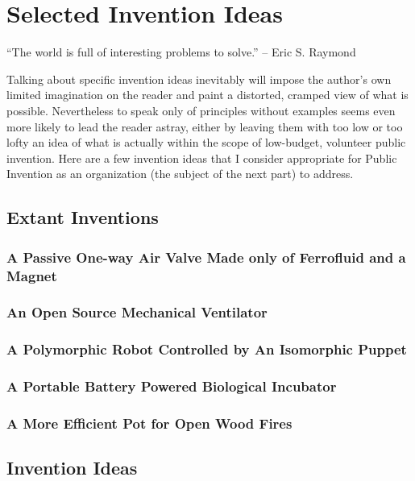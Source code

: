 \documentclass[
	fontsize=10pt, %
	twoside=false, %
	secnumdepth=1, %
]{kaobook}
\begin{document}
\chapter{Selected Invention Ideas}

``The world is full of interesting problems to solve.'' -- Eric S. Raymond

Talking about specific invention ideas inevitably will impose the author's own limited
imagination on the reader and paint a distorted, cramped view of what is possible.
Nevertheless to speak only of principles without examples seems even more
likely to lead the reader astray, either by leaving them with too low or too lofty
an idea of what is actually within the scope of low-budget, volunteer public invention.
Here are a few invention ideas that I consider appropriate for Public Invention
as an organization (the subject of the next part) to address.

\section{Extant Inventions}
\subsection{A Passive One-way Air Valve Made only of Ferrofluid and a Magnet}

\subsection{An Open Source Mechanical Ventilator}

\subsection{A Polymorphic Robot Controlled by An Isomorphic Puppet}

\subsection{A Portable Battery Powered Biological Incubator}

\subsection{A More Efficient Pot for Open Wood Fires}

\section{Invention Ideas}
\end{document}
